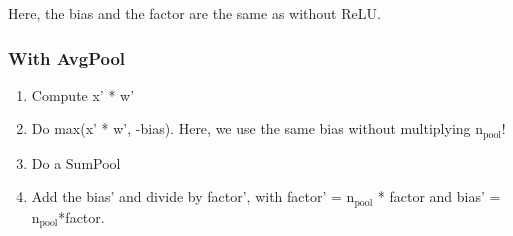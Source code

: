 \documentclass[11pt]{article}
\begin{document}
Here, the bias and the factor are the same as without ReLU.
\subsubsection{With AvgPool}
\label{sec:orgbffc90a}
\begin{enumerate}
\item Compute x' * w'
\item Do max(x' * w', -bias). Here, we use the same bias without multiplying n\(_{\text{pool}}\)!
\item Do a SumPool
\item Add the bias' and divide by factor', with factor' = n\(_{\text{pool}}\) * factor and bias' = n\(_{\text{pool}}\)*factor.
\end{enumerate}
\end{document}
